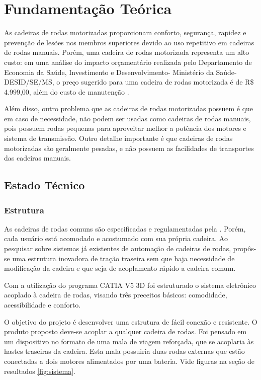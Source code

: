 \chapter{Fundamentação Teórica}

As cadeiras de rodas motorizadas proporcionam conforto, segurança, rapidez e prevenção de lesões nos membros superiores devido ao uso repetitivo em cadeiras de rodas manuais. Porém, uma cadeira de rodas motorizada representa um alto custo: em uma análise do impacto orçamentário realizada pelo Departamento de Economia da Saúde, Investimento e Desenvolvimento- Ministério da Saúde-DESID/SE/MS, o preço sugerido para uma cadeira de rodas motorizada é de R\$ 4.999,00, além do custo de manutenção \cite{relatorio_sus}.

Além disso, outro problema que as cadeiras de rodas motorizadas possuem é que em caso de necessidade, não podem ser usadas como cadeiras de rodas manuais, pois possuem rodas pequenas para aproveitar melhor a potência dos motores e sistema de transmissão. Outro detalhe importante é que cadeiras de rodas motorizadas são geralmente pesadas, e não possuem as facilidades de transportes das cadeiras manuais.

\section{Estado Técnico}

\subsection{Estrutura}
As cadeiras de rodas comuns são especificadas e regulamentadas pela \cite{nbr9050}. Porém, cada usuário está acomodado e acostumado com sua própria cadeira. Ao pesquisar sobre sistemas já existentes de automação de cadeiras de rodas, propôs-se uma estrutura inovadora de tração traseira sem que haja necessidade de modificação da cadeira e que seja de acoplamento rápido a cadeira comum.

Com a utilização do programa CATIA V5 3D foi estruturado o sistema eletrônico acoplado à cadeira de rodas, visando três preceitos básicos: comodidade, acessibilidade e conforto.

O objetivo do projeto é desenvolver uma estrutura de fácil conexão e resistente. O produto proposto deve-se acoplar a qualquer cadeira de rodas. Foi pensado em um dispositivo no formato de uma mala de viagem reforçada, que se acoplaria às hastes traseiras da cadeira. Esta mala possuiria duas rodas externas que estão conectadas a dois motores alimentados por uma bateria. Vide figuras na seção de resultados \ref{fig:sistema}.

